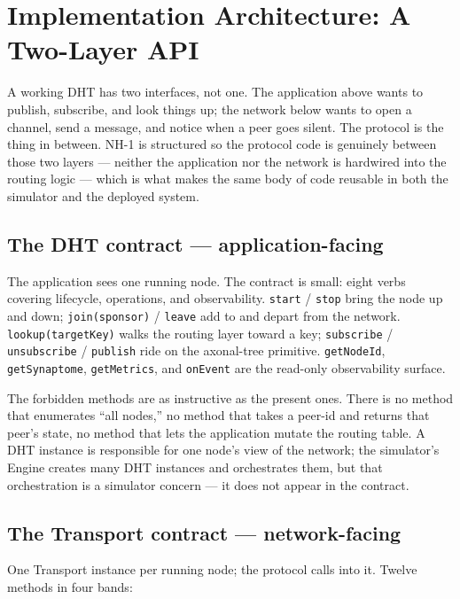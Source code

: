 \documentclass[conference]{IEEEtran}
\newcommand{\nhone}{NH-1\xspace}
\begin{document}
\section{Implementation Architecture: A Two-Layer API}
\label{sec:architecture}

A working DHT has two interfaces, not one. The application above
wants to publish, subscribe, and look things up; the network below
wants to open a channel, send a message, and notice when a peer
goes silent. The protocol is the thing in between. \nhone is
structured so the protocol code is genuinely between those two
layers --- neither the application nor the network is hardwired
into the routing logic --- which is what makes the same body of
code reusable in both the simulator and the deployed system.

\subsection{The DHT contract --- application-facing}

The application sees one running node. The contract is small:
eight verbs covering lifecycle, operations, and observability.
\texttt{start} / \texttt{stop} bring the node up and down;
\texttt{join(sponsor)} / \texttt{leave} add to and depart from the
network. \texttt{lookup(targetKey)} walks the routing layer toward
a key; \texttt{subscribe} / \texttt{unsubscribe} / \texttt{publish}
ride on the axonal-tree primitive. \texttt{getNodeId},
\texttt{getSynaptome}, \texttt{getMetrics}, and \texttt{onEvent}
are the read-only observability surface.

The forbidden methods are as instructive as the present ones.
There is no method that enumerates ``all nodes,'' no method that
takes a peer-id and returns that peer's state, no method that lets
the application mutate the routing table. A DHT instance is
responsible for one node's view of the network; the simulator's
Engine creates many DHT instances and orchestrates them, but that
orchestration is a simulator concern --- it does not appear in the
contract.

\subsection{The Transport contract --- network-facing}

One Transport instance per running node; the protocol calls into
it. Twelve methods in four bands:
\end{document}
